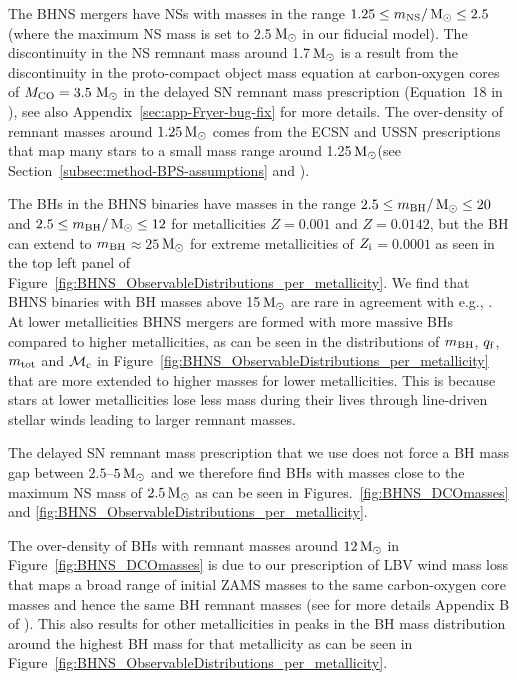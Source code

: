 \documentclass[twocolumn]{aastex63}
\newcommand\bhnsSingle{BHNS\xspace}
\newcommand{\Zi}{\ensuremath{Z_{\rm{i}}}\xspace}
\newcommand{\Msun}{\ensuremath{\,\rm{M}_{\odot}}\xspace}
\newcommand{\mnsf}{\ensuremath{m_{\rm{NS}}}\xspace}
\newcommand{\mbhf}{\ensuremath{m_{\rm{BH}}}\xspace}
\newcommand{\mtotf}{\ensuremath{m_{\rm{tot}}}\xspace}
\newcommand{\mchirpf}{\ensuremath{{\mathcal{M}}_{\rm{c}}}\xspace}
\newcommand{\qf}{\ensuremath{q_{\rm{f}}}\xspace}
\begin{document}
The   \bhnsSingle mergers have \acp{NS} with masses in the range $1.25 \leq \mnsf/\Msun \leq 2.5$ (where the maximum \ac{NS} mass is set to 2.5\Msun in our fiducial model). 
The discontinuity in the \ac{NS} remnant mass around 1.7\Msun is a result from the discontinuity in the proto-compact object mass equation at carbon-oxygen cores of $M_{\rm{CO}}= 3.5$\Msun  in the delayed \ac{SN} remnant mass prescription (Equation~18 in  \citealt{2012ApJ...749...91F}), see also Appendix~\ref{sec:app-Fryer-bug-fix} for more details. 
The over-density of remnant masses around $1.25\Msun$ comes from the  \ac{ECSN} and \ac{USSN} prescriptions that map many stars to a small mass range around 1.25\Msun  (see Section~\ref{subsec:method-BPS-assumptions} and \citealt{2018MNRAS.481.4009V}). 
 



	 The \acp{BH} in the \bhnsSingle binaries have masses in the range  $2.5 \leq \mbhf/\Msun \leq 20$ and $2.5 \leq \mbhf/\Msun \leq 12$ for metallicities  $Z=0.001$ and  $Z=0.0142$, but the \ac{BH} can extend to \mbhf $\approx 25$\Msun for extreme metallicities of \Zi $=0.0001$ as seen in the top left panel of Figure~\ref{fig:BHNS_ObservableDistributions_per_metallicity}. 
	 We find that \bhnsSingle binaries with \ac{BH} masses above 15\Msun are rare in agreement with e.g., \citet{2020arXiv200302277R}. 
At lower metallicities \bhnsSingle mergers are formed with more massive \acp{BH} compared to higher metallicities, as can be seen in the distributions of \mbhf, \qf,  \mtotf and  \mchirpf in Figure~\ref{fig:BHNS_ObservableDistributions_per_metallicity} that are more extended to higher masses for lower metallicities. 
This is because stars at lower metallicities lose less mass during their lives through  line-driven stellar winds leading to larger remnant masses.  

The delayed  \ac{SN} remnant mass prescription that we use does not force a \ac{BH} mass gap between $2.5$--$5\Msun$ and we therefore find \acp{BH} with masses close to the maximum \ac{NS} mass of $2.5\Msun$ as can be seen in Figures.~\ref{fig:BHNS_DCOmasses}  and \ref{fig:BHNS_ObservableDistributions_per_metallicity}. 

The over-density of BHs with remnant masses around $12\Msun$ in Figure~\ref{fig:BHNS_DCOmasses} is due to our prescription of LBV wind mass loss that maps a broad range of initial ZAMS masses to the same carbon-oxygen core masses and hence the same \ac{BH} remnant masses (see for more details Appendix B of  \citealt{2019MNRAS.490.3740N}). 
This also results for other metallicities in peaks in the \ac{BH} mass distribution around the highest \ac{BH} mass for that metallicity as can be seen in Figure~\ref{fig:BHNS_ObservableDistributions_per_metallicity}. 
\end{document}
